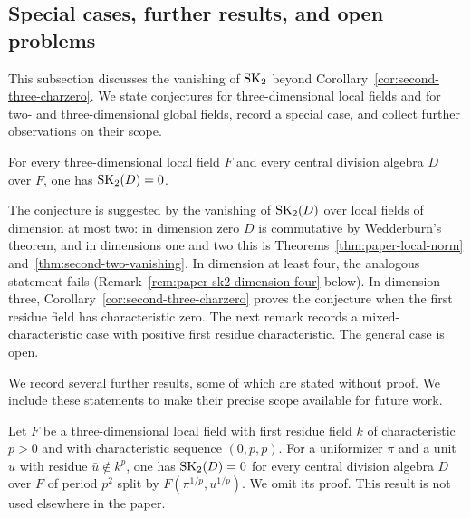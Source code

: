 \subsection{Special cases, further results, and open problems}\label{sec:paper-further-results}
This subsection discusses the vanishing of $\operatorname{SK}_2$ beyond Corollary~\ref{cor:second-three-charzero}.
We state conjectures for three-dimensional local fields and for two- and three-dimensional global fields, record a special case, and collect further observations on their scope.
\begin{conjecture}\label{conj:paper-three-local-sk2}
For every three-dimensional local field $F$ and every central division algebra $D$ over $F$, one has $\operatorname{SK}_2(D)=0$.
\end{conjecture}

The conjecture is suggested by the vanishing of $\operatorname{SK}_2(D)$ over local fields of dimension at most two: in dimension zero $D$ is commutative by Wedderburn's theorem, and in dimensions one and two this is Theorems~\ref{thm:paper-local-norm} and~\ref{thm:second-two-vanishing}.
In dimension at least four, the analogous statement fails (Remark~\ref{rem:paper-sk2-dimension-four} below).
In dimension three, Corollary~\ref{cor:second-three-charzero} proves the conjecture when the first residue field has characteristic zero.
The next remark records a mixed-characteristic case with positive first residue characteristic.
The general case is open.

We record several further results, some of which are stated without proof.
We include these statements to make their precise scope available for future work.

\begin{remark}
Let $F$ be a three-dimensional local field with first residue field $k$ of characteristic $p>0$ and with characteristic sequence $(0,p,p)$.
For a uniformizer $\pi$ and a unit $u$ with residue $\bar u\notin k^p$, one has $\operatorname{SK}_2(D)=0$ for every central division algebra $D$ over $F$ of period $p^2$ split by $F(\pi^{1/p},u^{1/p})$.
We omit its proof.
This result is not used elsewhere in the paper.
\end{remark}

